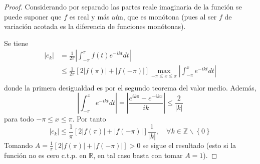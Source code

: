 \documentclass[12pt]{report}
\theoremstyle{largebreak}
\renewcommand{\leq}{\ensuremath{\leqslant}}
\newcommand\abs[1]{\ensuremath{\left|#1\right|}}
\begin{document}
    \begin{proof}
        Considerando por separado las partes reale imaginaria de la función se puede suponer que $f$ es real y más aún, que es monótona (pues al ser $f$ de variación acotada es la diferencia de funciones monótonas).

        Se tiene
        \begin{equation*}
            \begin{split}
                \abs{c_k}&=\frac{1}{2\pi}\abs{\int_{-\pi}^\pi f(t)e^{ -ikt}dt}\\
                &\leq\frac{1}{2\pi}\left[2\abs{f(\pi)}+\abs{f(-\pi)} \right]\max_{ -\pi\leq x\leq\pi}\abs{\int_{ -\pi}^x e^{ -ikt}dt}\\
            \end{split}
        \end{equation*}
        donde la primera desigualdad es por el segundo teorema del valor medio. Además,
        \begin{equation*}
            \abs{\int_{ -\pi}^x e^{ -ikt}dt}=\abs{\frac{e^{ ik\pi}-e^{- ikx}}{ik}}\leq\frac{2}{\abs{k}}
        \end{equation*}
        para todo $-\pi\leq x\leq\pi$. Por tanto
        \begin{equation*}
            \abs{c_k}\leq\frac{1}{\pi}[2\abs{f(\pi)}+\abs{f(-\pi)}]\frac{1}{\abs{k}},\quad\forall k\in\mathbb{Z}\backslash\left\{0\right\}
        \end{equation*}
        Tomando $A=\frac{1}{\pi}[2\abs{f(\pi)}+\abs{f(-\pi)}]>0$ se sigue el resultado (esto si la función no es cero c.t.p. en $\mathbb{R}$, en tal caso basta con tomar $A=1$).
    \end{proof}
\end{document}
